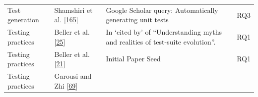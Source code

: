 \documentclass[]{book}
\begin{document}
\begin{longtable}[]{@{}llll@{}}
\begin{minipage}[t]{0.18\columnwidth}
Test generation\strut
\end{minipage} & \begin{minipage}[t]{0.16\columnwidth}\raggedright\strut
Shamshiri et al.
{[}\protect\hyperlink{ref-shamshiri2018automatically}{165}{]}\strut
\end{minipage} & \begin{minipage}[t]{0.50\columnwidth}\raggedright\strut
Google Scholar query: Automatically generating unit tests\strut
\end{minipage} & \begin{minipage}[t]{0.04\columnwidth}\raggedright\strut
RQ3\strut
\end{minipage}\tabularnewline
\begin{minipage}[t]{0.18\columnwidth}\raggedright\strut
Testing practices\strut
\end{minipage} & \begin{minipage}[t]{0.16\columnwidth}\raggedright\strut
Beller et al. {[}\protect\hyperlink{ref-beller2015}{25}{]}\strut
\end{minipage} & \begin{minipage}[t]{0.50\columnwidth}\raggedright\strut
In `cited by' of ``Understanding myths and realities of test-suite
evolution''.\strut
\end{minipage} & \begin{minipage}[t]{0.04\columnwidth}\raggedright\strut
RQ1\strut
\end{minipage}\tabularnewline
\begin{minipage}[t]{0.18\columnwidth}\raggedright\strut
Testing practices\strut
\end{minipage} & \begin{minipage}[t]{0.16\columnwidth}\raggedright\strut
Beller et al.
{[}\protect\hyperlink{ref-beller2017developer}{21}{]}\strut
\end{minipage} & \begin{minipage}[t]{0.50\columnwidth}\raggedright\strut
Initial Paper Seed\strut
\end{minipage} & \begin{minipage}[t]{0.04\columnwidth}\raggedright\strut
RQ1\strut
\end{minipage}\tabularnewline
\begin{minipage}[t]{0.18\columnwidth}\raggedright\strut
Testing practices\strut
\end{minipage} & \begin{minipage}[t]{0.16\columnwidth}\raggedright\strut
Garousi and Zhi {[}\protect\hyperlink{ref-GAROUSI20131354}{69}{]}\strut

\end{minipage}
\end{longtable}
\end{document}

